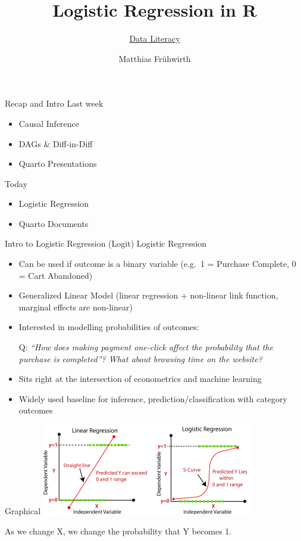 \documentclass[
  10pt,
  ignorenonframetext,
]{beamer}
\title{Logistic Regression in R}
\subtitle{\href{./index.html}{Data Literacy}}
\author{Matthias Frühwirth}
\date{}
\institute{\href{https://www.wu.ac.at/retail/}{Institute for Retailing
\& Data Science}}
\providecommand{\tightlist}{%
  \setlength{\itemsep}{0pt}\setlength{\parskip}{0pt}}\usepackage{longtable,booktabs,array}
\begin{document}
\frame{\titlepage}


\begin{frame}{Recap and Intro}
\label{recap-and-intro}
Last week

\begin{itemize}
\tightlist
\item
  Causal Inference
\item
  DAGs \& Diff-in-Diff
\item
  Quarto Presentations
\end{itemize}

Today

\begin{itemize}
\tightlist
\item
  Logistic Regression
\item
  Quarto Documents
\end{itemize}
\end{frame}

\begin{frame}{Intro to Logistic Regression (Logit)}
\label{intro-to-logistic-regression-logit}
Logistic Regression

\begin{itemize}
\item
  Can be used if outcome is a binary variable (e.g.~1 = Purchase
  Complete, 0 = Cart Abandoned)
\item
  Generalized Linear Model (linear regression + non-linear link
  function, marginal effects are non-linear)
\item
  Interested in modelling probabilities of outcomes:

  Q: \emph{``How does making payment one-click affect the probability
  that the purchase is completed''? What about browsing time on the
  website?}
\item
  Sits right at the intersection of econometrics and machine learning
\item
  Widely used baseline for inference, prediction/classification with
  category outcomes
\end{itemize}
\end{frame}

\begin{frame}{Graphical}
\label{graphical}
\includegraphics[width=3.64583in,height=\textheight]{images/linear-regression-vs-logistic-regression.png}

As we change X, we change the probability that Y becomes 1.
\end{frame}
\end{document}
